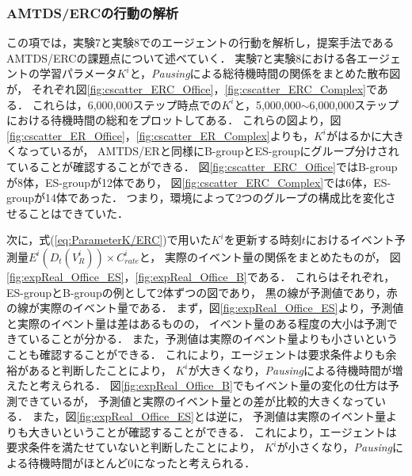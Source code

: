 \documentclass[12pt,a4j,twoside]{jarticle}
\begin{document}
  \subsubsection{AMTDS/ERCの行動の解析}\label{sec:expAnalsisERC}
  この項では，実験7と実験8でのエージェントの行動を解析し，提案手法であるAMTDS/ERCの課題点について述べていく．
  実験7と実験8における各エージェントの学習パラメータ$K^i$と，{\em Pausing}による総待機時間の関係をまとめた散布図が，
  それぞれ図\ref{fig:cscatter_ERC_Office}，\ref{fig:cscatter_ERC_Complex}である．
  これらは，6,000,000ステップ時点での$K^i$と，5,000,000$\sim$6,000,000ステップにおける待機時間の総和をプロットしてある．
  これらの図より，図\ref{fig:cscatter_ER_Office}，\ref{fig:cscatter_ER_Complex}よりも，$K^i$がはるかに大きくなっているが，
  AMTDS/ERと同様にB-groupとES-groupにグループ分けされていることが確認することができる．
  図\ref{fig:cscatter_ERC_Office}ではB-groupが8体，ES-groupが12体であり，
  図\ref{fig:cscatter_ERC_Complex}では6体，ES-groupが14体であった．
  つまり，環境によって2つのグループの構成比を変化させることはできていた．
  \par

  次に，式(\ref{eq:ParameterK/ERC})で用いた$K^i$を更新する時刻$t$におけるイベント予測量$E^i(D_t(V^i_R)) \times C^i_{rate}$と，
  実際のイベント量の関係をまとめたものが，
  図\ref{fig:expReal_Office_ES}，\ref{fig:expReal_Office_B}である．
  これらはそれぞれ，ES-groupとB-groupの例として2体ずつの図であり，
  黒の線が予測値であり，赤の線が実際のイベント量である．
  まず，図\ref{fig:expReal_Office_ES}より，予測値と実際のイベント量は差はあるものの，
  イベント量のある程度の大小は予測できていることが分かる．
  また，予測値は実際のイベント量よりも小さいということも確認することができる．
  これにより，エージェントは要求条件よりも余裕があると判断したことにより，
  $K^i$が大きくなり，{\em Pausing}による待機時間が増えたと考えられる．
  図\ref{fig:expReal_Office_B}でもイベント量の変化の仕方は予測できているが，
  予測値と実際のイベント量との差が比較的大きくなっている．
  また，図\ref{fig:expReal_Office_ES}とは逆に，
  予測値は実際のイベント量よりも大きいということが確認することができる．
  これにより，エージェントは要求条件を満たせていないと判断したことにより，
  $K^i$が小さくなり，{\em Pausing}による待機時間がほとんど0になったと考えられる．
  \par
\end{document}
